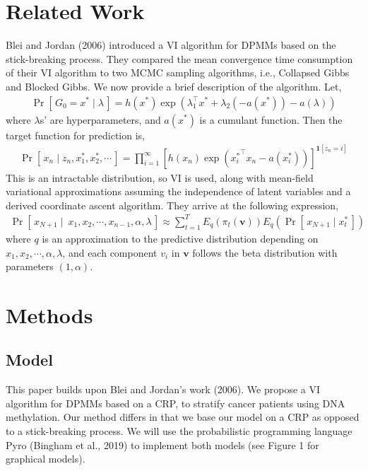 \documentclass{article}
\newcommand{\prob}[1]{\operatorname{Pr}\left[\,#1\,\right]}
\def\cond{\; | \;}
\begin{document}
\section{Related Work}
Blei and Jordan (2006) introduced a VI algorithm for DPMMs based on the stick-breaking process. They compared the mean convergence time consumption of their VI algorithm to two MCMC sampling algorithms, i.e., Collapsed Gibbs and Blocked Gibbs. We now provide a brief description of the algorithm. Let,
\begin{align*}
\prob{G_0 = x^*\cond \lambda} = h(x^*)\exp(\lambda_1^\top x^* + \lambda_2(-a(x^*)) - a(\lambda))
\end{align*}
where $\lambda$s' are hyperparameters,  and $a(x^*)$ is a cumulant function.  Then the target function for prediction is,
\begin{align*}
\prob{x_n\cond z_n, x_1^*, x_2^*, \cdots} = \prod_{i=1}^\infty [h(x_n)\exp({x_i^*}^\top x_n - a(x_i^*))]^{\mathbf{1}[z_n = i]}
\end{align*}
This is an intractable distribution, so VI is used, along with mean-field variational approximations assuming the independence of latent variables and a derived coordinate ascent algorithm. They arrive at the following expression,
\begin{align*}
\prob{x_{N+1}\cond \ x_1, x_2, \cdots, x_{n-1}, \alpha, \lambda}\approx \sum_{t=1}^T E_q(\pi_t(\mathbf{v}))E_q(\prob{x_{N+1}\cond x_t^*})
\end{align*}
where $q$ is an approximation to the predictive distribution depending on $x_1, x_2, \cdots, \alpha, \lambda$,  and each component $v_i$ in $\mathbf{v}$ follows the beta distribution with parameters $(1, \alpha)$.

\section{Methods}
\subsection{Model}
This paper builds upon Blei and Jordan's work (2006). We propose a VI algorithm for DPMMs based on a CRP, to stratify cancer patients using DNA methylation. Our method differs in that we base our model on a CRP as opposed to a stick-breaking process. We will use the probabilistic programming language Pyro (Bingham et al., 2019) to implement both models (see Figure 1 for graphical models).
\end{document}
